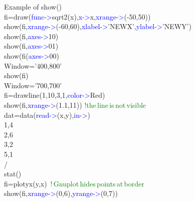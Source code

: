 \begin{example}[showex]Example of \textcolor{VioletRed}{show}()\\
\label{showex}
fi=\textcolor{VioletRed}{draw}(\textcolor{blue}{func->}\textcolor{VioletRed}{sqrt2}(x),\textcolor{blue}{x->}x,\textcolor{blue}{xrange->}(-50,50))\\
\textcolor{VioletRed}{show}(fi,\textcolor{blue}{xrange->}(-60,60),\textcolor{blue}{xlabel->}'NEWX',\textcolor{blue}{ylabel->}'NEWY')\\
\textcolor{VioletRed}{show}(fi,\textcolor{blue}{axes->}10)\\
\textcolor{VioletRed}{show}(fi,\textcolor{blue}{axes->}01)\\
\textcolor{VioletRed}{show}(fi(\textcolor{blue}{axes->}00)\\
Window='400,800'\\
\textcolor{VioletRed}{show}(fi)\\
Window='700,700'\\
fi=\textcolor{VioletRed}{drawline}(1,10,3,1,\textcolor{blue}{color->}Red)\\
\textcolor{VioletRed}{show}(fi,\textcolor{blue}{xrange->}(1.1,11)) \textcolor{green}{!the\,line\,is\,not\,visible}\\
dat=\textcolor{VioletRed}{data}(\textcolor{blue}{read->}(x,y),\textcolor{blue}{in->})\\
1,4\\
2,6\\
3,2\\
5,1\\
/\\
\textcolor{VioletRed}{stat}()\\
fi=\textcolor{VioletRed}{plotyx}(y,x) \,\textcolor{green}{!\,Gnuplot\,hides\,points\,at\,border}\\
\textcolor{VioletRed}{show}(fi,\textcolor{blue}{xrange->}(0,6),\textcolor{blue}{yrange->}(0,7))
\end{example}
